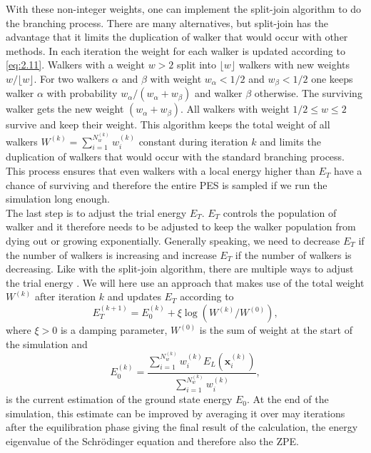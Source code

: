 \documentclass [12pt]{report}
\begin{document}
With these non-integer weights, one can implement the split-join algorithm \cite{split_join} to do the branching process. There are many alternatives, but split-join has the advantage that it limits the duplication of walker that would occur with other methods.
 In each iteration the weight for each walker is updated according to \eqref{eq:2.11}. Walkers with a weight $w > 2$ split into $\lfloor w \rfloor$ walkers with new weights $w/\lfloor w \rfloor$. For two walkers $\alpha$ and $\beta$ with weight $w_\alpha < 1/2$ and $w_\beta < 1/2$ one keeps walker $\alpha$  with probability $w_\alpha/(w_\alpha + w_\beta)$ and walker $\beta$ otherwise. The surviving walker gets the new weight $(w_\alpha + w_\beta)$. All walkers with weight $1/2 \leq w \leq 2$ survive and keep their weight. This algorithm keeps the total weight of all walkers $W^{(k)} =  \sum_{i = 1}^{N_w^{(k)}} w_i^{(k)}$ constant during iteration $k$ and limits the duplication of walkers that would occur with the standard branching process.
 This process ensures that even walkers with a local energy higher than $E_T$ have a chance of surviving and therefore the entire PES is sampled if we run the simulation long enough. \\
The last step is to adjust the trial energy $E_T$. $E_T$ controls the population of walker and it therefore needs to be adjusted to keep the walker population from dying out or growing exponentially. Generally speaking, we need to decrease $E_T$ if the number of walkers is increasing and increase $E_T$ if the number of walkers is decreasing.  Like with the split-join algorithm, there are multiple ways to adjust the trial energy \cite{mccoy,alavi}. We will here use an approach \cite{cyrus} that makes use of the total weight $W^{(k)}$ after iteration $k$ and updates $E_T$ according to
\begin{equation}\label{eq:2.12} 
E_T^{(k+1)} = E_0^{(k)} + \xi \log(W^{(k)}/W^{(0)}),
\end{equation}
where $\xi > 0$ is a damping parameter, $W^{(0)}$ is the sum of weight at the start of the simulation and
\begin{equation}\label{eq:2.13} 
E_0^{(k)} = \frac{\sum_{i = 1}^{N_w^{(k)}} w_{i}^{(k)} E_L(\bm{x}_{i}^{(k)})}{\sum_{i = 1}^{N_w^{(k)}} w_{i}^{(k)} },
\end{equation}
is the current estimation of the ground state energy $E_0$. At the end of the simulation, this estimate can be improved by averaging it over may iterations after the equilibration phase giving the final result of the calculation, the energy eigenvalue of the Schrödinger equation and therefore also the ZPE.
\end{document}
